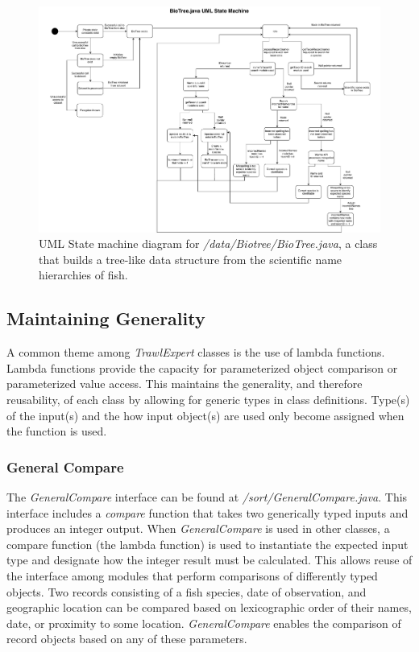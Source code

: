 \documentclass{article}
\begin{document}
\begin{figure}[H]
\centering
\includegraphics[width=18cm, trim={0 0 0 0}, clip]{BioTreeDotJava.pdf}

\caption{UML State machine diagram for \textit{/data/Biotree/BioTree.java}, a class that builds a tree-like data structure from the scientific name hierarchies of fish. }
\label{fig:Tree}
\end{figure}

\subsection{Maintaining Generality}
A common theme among \textit{TrawlExpert} classes is the use of lambda functions. Lambda functions provide the capacity for parameterized object comparison or parameterized value access. This maintains the generality, and therefore reusability, of each class by allowing for generic types in class definitions. Type(s) of the input(s) and the how input object(s) are used only become assigned when the function is used.

\subsubsection{General Compare}
The \textit{GeneralCompare} interface can be found at \textit{/sort/GeneralCompare.java}. This interface includes a \textit{compare} function that takes two generically typed inputs and produces an integer output. When \textit{GeneralCompare} is used in other classes, a compare function (the lambda function) is used to instantiate the expected input type and designate how the integer result must be calculated. This allows reuse of the interface among modules that perform comparisons of differently typed objects. Two records consisting of a fish species, date of observation, and geographic location can be compared based on lexicographic order of their names, date, or proximity to some location. \textit{GeneralCompare} enables the comparison of record objects based on any of these parameters. 
\end{document}
